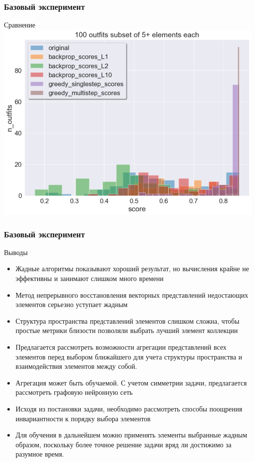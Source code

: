 \documentclass[10pt]{beamer}
\begin{document}
\begin{frame}
	\frametitle{Базовый эксперимент}
	\begin{block}{Сравнение}
		\includegraphics[scale = 0.52]{figures/greedy_and_backprop_at_least_5_subset100.png}
	\end{block}
\end{frame}


\begin{frame}
	\frametitle{Базовый эксперимент}
	\begin{block}{Выводы}
		\begin{itemize}
			\item Жадные алгоритмы показывают хороший результат, но вычисления крайне не эффективны и занимают слишком много времени
			\item Метод непрерывного восстановления векторных представлений недостающих элементов серьезно уступает жадным
			\item Структура пространства представлений элементов слишком сложна, чтобы простые метрики близости позволяли выбрать лучший элемент коллекции 
			\item Предлагается рассмотреть возможности агрегации представлений всех элементов перед выбором ближайшего для учета структуры пространства и взаимодействия элементов между собой.
			\item Агрегация может быть обучаемой. С учетом симметрии задачи, предлагается рассмотреть графовую нейронную сеть
			\item Исходя из постановки задачи, необходимо рассмотреть способы поощрения инвариантности к порядку выбора элементов
			\item Для обучения в дальнейшем можно применять элементы выбранные жадным образом, поскольку более точное решение задачи вряд ли достижимо за разумное время.
				
		\end{itemize}
	\end{block}
\end{frame}
\end{document}

